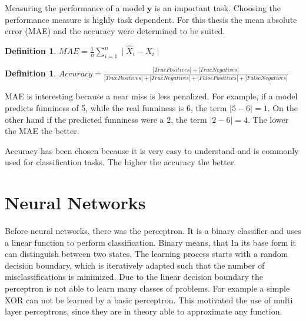 \documentclass[draft,final,oneside]{vutinfth} %
\newcounter{DefCounter}
\begin{document}

Measuring the performance of a model $\boldsymbol{y}$ is an important task. Choosing the performance measure is highly task dependent. For this thesis the mean absolute error (MAE) and the accuracy were determined to be suited.

\newtheorem{mae}[DefCounter]{Definition}

\begin{mae}
$MAE = \frac{1}{n}\textstyle \sum_{i=1}^n \displaystyle\mid \hat{X}_i - X_i \mid$
\end{mae}

\newtheorem{accuracy}[DefCounter]{Definition}
\begin{accuracy}
$Accuracy = \frac{|True Positives| + |True Negatives|} {|True Positives| + |True Negatives| + |False Positives| + |False Negatives|}$
\end{accuracy}

MAE is interesting because a near miss is less penalized. For example, if a model predicts funniness of 5, while the real funniness is 6, the term $\mid 5 - 6 \mid = 1$. On the other hand if the predicted funniness were a 2, the term $\mid 2 - 6 \mid = 4$. The lower the MAE the better.

Accuracy has been chosen because it is very easy to understand and is commonly used for classification tasks. The higher the accuracy the better.





\section{Neural Networks}

Before neural networks, there was the perceptron. It is a binary classifier and uses a linear function to perform classification. Binary means, that In its base form it can distinguish between two states. The learning process starts with a random decision boundary, which is iteratively adapted such that the number of misclassifications is minimized. Due to the linear decision boundary the perceptron is not able to learn many classes of problems. For example a simple XOR can not be learned by a basic perceptron. This motivated the use of multi layer perceptrons, since they are in theory able to approximate any function.
\end{document}
